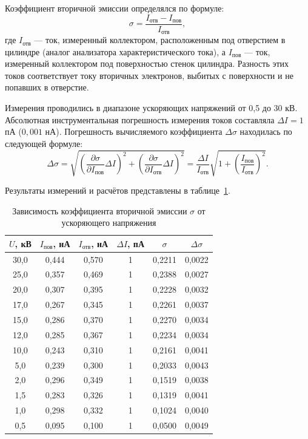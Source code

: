 \documentclass[12pt, a4paper]{article}
\begin{document}
Коэффициент вторичной эмиссии определялся по формуле:
\begin{equation}
    \sigma = \frac{I_{\text{отв}} - I_{\text{пов}}}{I_{\text{отв}}},
\end{equation}
где $I_{\text{отв}}$ --- ток, измеренный коллектором, расположенным под отверстием в цилиндре (аналог анализатора характеристического тока), а $I_{\text{пов}}$ --- ток, измеренный коллектором под поверхностью стенок цилиндра. Разность этих токов соответствует току вторичных электронов, выбитых с поверхности и не попавших в отверстие.

Измерения проводились в диапазоне ускоряющих напряжений от 0,5 до 30 кВ. Абсолютная инструментальная погрешность измерения токов составляла $\Delta I = 1$ пА ($0{,}001$ нА). Погрешность вычисляемого коэффициента $\Delta \sigma$ находилась по следующей формуле:
\begin{equation}
    \Delta \sigma = \sqrt{ \left( \frac{\partial \sigma}{\partial I_{\text{пов}}} \Delta I \right)^2 + \left( \frac{\partial \sigma}{\partial I_{\text{отв}}} \Delta I \right)^2 } = \frac{\Delta I}{I_{\text{отв}}} \sqrt{ 1 + \left( \frac{I_{\text{пов}}}{I_{\text{отв}}} \right)^2 }.
\end{equation}

Результаты измерений и расчётов представлены в таблице~\ref{tab:sigma_data}.

\begin{table}[h]
    \centering
    \caption{Зависимость коэффициента вторичной эмиссии $\sigma$ от ускоряющего напряжения}
    \label{tab:sigma_data}
    \begin{tabular}{|c|c|c|c|c|c|}
        \hline
        $U$, кВ & $I_{\text{пов}}$, нА & $I_{\text{отв}}$, нА & $\Delta I$, пА & $\sigma$ & $\Delta \sigma$ \\
        \hline
        30,0 & 0,444 & 0,570 & 1 & 0,2211 & 0,0022 \\
        25,0 & 0,357 & 0,469 & 1 & 0,2388 & 0,0027 \\
        20,0 & 0,307 & 0,395 & 1 & 0,2228 & 0,0032 \\
        17,0 & 0,267 & 0,345 & 1 & 0,2261 & 0,0037 \\
        15,0 & 0,286 & 0,370 & 1 & 0,2270 & 0,0034 \\
        12,0 & 0,285 & 0,367 & 1 & 0,2234 & 0,0034 \\
        10,0 & 0,243 & 0,310 & 1 & 0,2161 & 0,0041 \\
        5,0 & 0,239 & 0,300 & 1 & 0,2033 & 0,0043 \\
        2,0 & 0,296 & 0,349 & 1 & 0,1519 & 0,0038 \\
        1,5 & 0,283 & 0,326 & 1 & 0,1319 & 0,0041 \\
        1,0 & 0,298 & 0,332 & 1 & 0,1024 & 0,0040 \\
        0,5 & 0,095 & 0,100 & 1 & 0,0500 & 0,0049 \\
        \hline
    \end{tabular}
\end{table}
\end{document}

